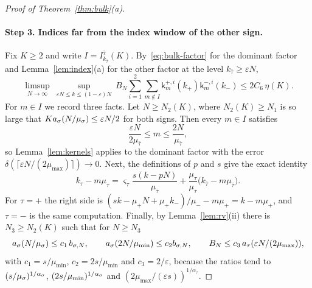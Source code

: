 \begin{proof}[Proof of Theorem~\ref{thm:bulk}(a)]
\paragraph{Step 3. Indices far from the index window of the other sign.}
Fix $K\ge2$ and write $I=I^{\bar\tau}_{k_{\bar\tau}}(K)$. By~\eqref{eq:bulk-factor} for
the dominant factor and Lemma~\ref{lem:index}(a) for the other factor at the level
$k_{\bar\tau}\ge\varepsilon N$,
\begin{equation}\label{eq:bulk-remote-counts}
 \limsup_{N\to\infty}\ \sup_{\varepsilon N\le k\le(1-\varepsilon)N}\
 B_N\sum_{i=1}^2\sum_{m\notin I}\mathsf k^{\plus,i}_m(k_\plus)\mathsf k^{\minus,i}_m(k_\minus)\le2C_6\,\eta(K).
\end{equation}
For $m\in I$ we record three facts. Let $N\ge N_2(K)$, where $N_2(K)\ge N_1$ is so
large that $Ka_\sigma(N/\mu_\sigma)\le\varepsilon N/2$ for both signs. Then every $m\in I$
satisfies
\begin{equation}\label{eq:bulk-window}
 \frac{\varepsilon N}{2\mu_{\bar\tau}}\le m\le\frac{2N}{\mu_{\bar\tau}} ,
\end{equation}
so Lemma~\ref{lem:kernels} applies to the dominant factor with the error
$\delta(\lceil\varepsilon N/(2\mu_{\max})\rceil)\to0$. Next, the definitions of $p$ and
$s$ give the exact identity
\begin{equation}\label{eq:bulk-shift}
 k_\tau-m\mu_\tau=\varsigma_\tau\frac{s(k-pN)}{\mu_{\bar\tau}}
 +\frac{\mu_\tau}{\mu_{\bar\tau}}\bigl(k_{\bar\tau}-m\mu_{\bar\tau}\bigr).
\end{equation}
For $\tau=\plus$ the right side is
$(sk-\mu_\plus N+\mu_\plus k_\minus)/\mu_\minus-m\mu_\plus=k-m\mu_\plus$, and $\tau=\minus$ is the
same computation. Finally, by Lemma~\ref{lem:rv}(ii) there is $N_3\ge N_2(K)$ such that
for $N\ge N_3$
\begin{equation}\label{eq:bulk-ratios}
 a_\sigma(N/\mu_\sigma)\le c_1\,b_{\sigma,N},\qquad
 a_\sigma(2N/\mu_{\min})\le c_2b_{\sigma,N},\qquad
 B_N\le c_3\,a_\tau(\varepsilon N/(2\mu_{\max})),
\end{equation}
with $c_1=s/\mu_{\min}$, $c_2=2s/\mu_{\min}$ and $c_3=2/\varepsilon$, because the ratios
tend to $(s/\mu_\sigma)^{1/\alpha_\sigma}$, $(2s/\mu_{\min})^{1/\alpha_\sigma}$ and
$(2\mu_{\max}/(\varepsilon s))^{1/\alpha_\tau}$.


\end{proof}
